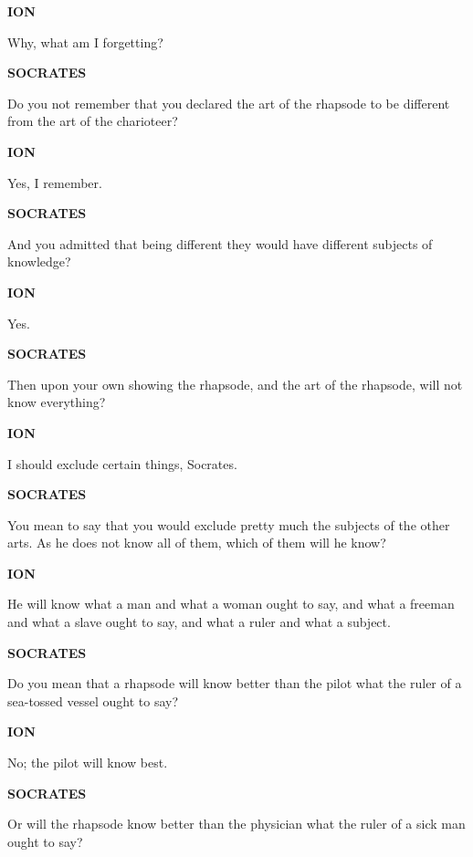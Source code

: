 \documentclass[11pt,letter]{article}
\begin{document}
\par \textbf{ION}
\par   Why, what am I forgetting?

\par \textbf{SOCRATES}
\par   Do you not remember that you declared the art of the rhapsode to be different from the art of the charioteer?

\par \textbf{ION}
\par   Yes, I remember.

\par \textbf{SOCRATES}
\par   And you admitted that being different they would have different subjects of knowledge?

\par \textbf{ION}
\par   Yes.

\par \textbf{SOCRATES}
\par   Then upon your own showing the rhapsode, and the art of the rhapsode, will not know everything?

\par \textbf{ION}
\par   I should exclude certain things, Socrates.

\par \textbf{SOCRATES}
\par   You mean to say that you would exclude pretty much the subjects of the other arts. As he does not know all of them, which of them will he know?

\par \textbf{ION}
\par   He will know what a man and what a woman ought to say, and what a freeman and what a slave ought to say, and what a ruler and what a subject.

\par \textbf{SOCRATES}
\par   Do you mean that a rhapsode will know better than the pilot what the ruler of a sea-tossed vessel ought to say?

\par \textbf{ION}
\par   No; the pilot will know best.

\par \textbf{SOCRATES}
\par   Or will the rhapsode know better than the physician what the ruler of a sick man ought to say?
\end{document}
